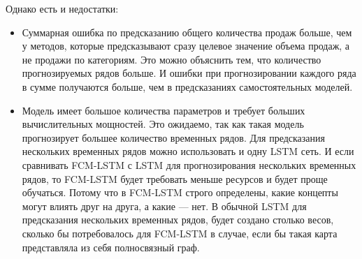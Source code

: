 Однако есть и недостатки:
\begin{itemize}
	\item Суммарная ошибка по предсказанию общего количества продаж больше,
	чем у методов, которые предсказывают сразу целевое значение объема продаж,
	а не продажи по категориям. Это можно объяснить тем, что количество прогнозируемых рядов больше.
	И ошибки при прогнозировании каждого ряда в сумме получаются больше, чем в предсказаниях
	самостоятельных моделей.
	\item Модель имеет большое количества параметров и требует больших вычислительных мощностей.
	Это ожидаемо, так как такая модель прогнозирует большее количество временных рядов.
	Для предсказания нескольких временных рядов можно использовать и одну LSTM
	сеть. И если сравнивать FCM-LSTM с LSTM для прогнозирования нескольких временных рядов,
	то FCM-LSTM будет требовать меньше ресурсов и будет проще обучаться. Потому что
	в FCM-LSTM строго определены, какие концепты могут влиять друг на друга, а какие --- нет.
	В обычной LSTM для предсказания нескольких временных рядов, будет создано столько весов,
	сколько бы потребовалось для FCM-LSTM в случае, если бы такая карта представляла из себя
	полносвязный граф.
\end{itemize}


